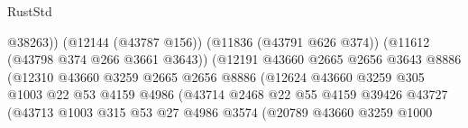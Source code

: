 \begin{lexlean}{RustStd}
\begin{coremodule}
                                                    @38263))
                                                (@12144 (@43787 @156))
                                                (@11836 (@43791 @626 @374))
                                                (@11612 (@43798 @374 @266 @3661 @3643))
                                                (@12191
                                                  @43660
                                                  @2665
                                                  @2656
                                                  @3643
                                                  @8886
                                                  (@12310
                                                    @43660
                                                    @3259
                                                    @2665
                                                    @2656
                                                    @8886
                                                    (@12624
                                                      @43660
                                                      @3259
                                                      @305
                                                      @1003
                                                      @22
                                                      @53
                                                      @4159
                                                      @4986
                                                      (@43714
                                                        @2468
                                                        @22
                                                        @55
                                                        @4159
                                                        @39426
                                                        @43727
                                                        (@43713
                                                          @1003
                                                          @315
                                                          @53
                                                          @27
                                                          @4986
                                                          @3574
                                                          (@20789
                                                            @43660
                                                            @3259
                                                            @1000

\end{coremodule}
\end{lexlean}
